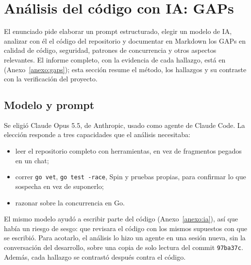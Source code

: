 \section{Análisis del código con IA: GAPs}\label{sec:gaps}

El enunciado pide elaborar un prompt estructurado, elegir un modelo de IA, analizar con él el código
del repositorio y documentar en Markdown los GAPs en calidad de código, seguridad, patrones de
concurrencia y otros aspectos relevantes. El informe completo, con la evidencia de cada hallazgo,
está en  (Anexo~\ref{anexo:gaps}); esta sección resume el método, los
hallazgos y su contraste con la verificación del proyecto.

\subsection{Modelo y prompt}

Se eligió Claude Opus 5.5, de Anthropic, usado como agente de Claude Code. La elección responde a
tres capacidades que el análisis necesitaba:
\begin{itemize}
  \item leer el repositorio completo con herramientas, en vez de fragmentos pegados en un chat;
  \item correr \texttt{go vet}, \texttt{go test -race}, Spin y pruebas propias, para confirmar lo que
        sospecha en vez de suponerlo;
  \item razonar sobre la concurrencia en Go.
\end{itemize}

El mismo modelo ayudó a escribir parte del código (Anexo~\ref{anexo:ia}), así que había un riesgo de
sesgo: que revisara el código con los mismos supuestos con que se escribió. Para acotarlo, el
análisis lo hizo un agente en una sesión nueva, sin la conversación del desarrollo, sobre una copia
de solo lectura del commit \texttt{97ba37c}. Además, cada hallazgo se contrastó después contra el
código.

